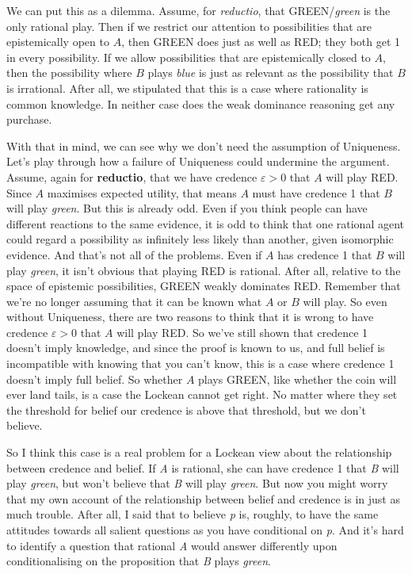 \documentclass[
  11pt,
  letterpaper,
  DIV=11,
  numbers=noendperiod,
  twoside]{scrartcl}
\begin{document}
We can put this as a dilemma. Assume, for \emph{reductio}, that
GREEN/\emph{green} is the only rational play. Then if we restrict our
attention to possibilities that are epistemically open to \(A\), then
GREEN does just as well as RED; they both get 1 in every possibility. If
we allow possibilities that are epistemically closed to \(A\), then the
possibility where \(B\) plays \emph{blue} is just as relevant as the
possibility that \(B\) is irrational. After all, we stipulated that this
is a case where rationality is common knowledge. In neither case does
the weak dominance reasoning get any purchase.

With that in mind, we can see why we don't need the assumption of
Uniqueness. Let's play through how a failure of Uniqueness could
undermine the argument. Assume, again for \textbf{reductio}, that we
have credence \(\varepsilon > 0\) that \(A\) will play RED. Since \(A\)
maximises expected utility, that means \(A\) must have credence 1 that
\(B\) will play \emph{green}. But this is already odd. Even if you think
people can have different reactions to the same evidence, it is odd to
think that one rational agent could regard a possibility as infinitely
less likely than another, given isomorphic evidence. And that's not all
of the problems. Even if \(A\) has credence 1 that \(B\) will play
\emph{green}, it isn't obvious that playing RED is rational. After all,
relative to the space of epistemic possibilities, GREEN weakly dominates
RED. Remember that we're no longer assuming that it can be known what
\(A\) or \(B\) will play. So even without Uniqueness, there are two
reasons to think that it is wrong to have credence \(\varepsilon > 0\)
that \(A\) will play RED. So we've still shown that credence 1 doesn't
imply knowledge, and since the proof is known to us, and full belief is
incompatible with knowing that you can't know, this is a case where
credence 1 doesn't imply full belief. So whether \(A\) plays GREEN, like
whether the coin will ever land tails, is a case the Lockean cannot get
right. No matter where they set the threshold for belief our credence is
above that threshold, but we don't believe.

So I think this case is a real problem for a Lockean view about the
relationship between credence and belief. If \emph{A} is rational, she
can have credence 1 that \emph{B} will play \emph{green}, but won't
believe that \emph{B} will play \emph{green}. But now you might worry
that my own account of the relationship between belief and credence is
in just as much trouble. After all, I said that to believe \emph{p} is,
roughly, to have the same attitudes towards all salient questions as you
have conditional on \emph{p}. And it's hard to identify a question that
rational \emph{A} would answer differently upon conditionalising on the
proposition that \emph{B} plays \emph{green}.
\end{document}
